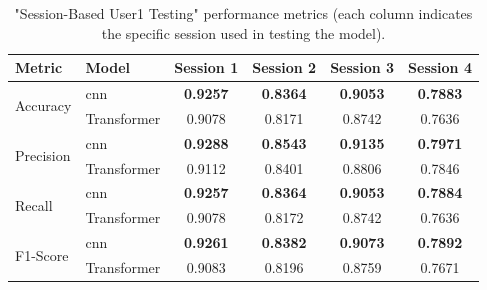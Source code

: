 \begin{table}[ht]
    \captionsetup{width=0.8\textwidth}
    \centering
    \caption{"Session-Based User1 Testing" performance metrics (each column indicates the specific session used in testing the model).}
    \label{table:results_session_based_user1}
    \begin{tabular}{l|lcccc}
        \toprule
        Metric & Model & Session 1 & Session 2 & Session 3 & Session 4 \\
        \midrule
        \multirow{2}{*}{Accuracy} & \acs{cnn} & \textbf{0.9257} & \textbf{0.8364} & \textbf{0.9053} & \textbf{0.7883} \\
        & Transformer & 0.9078 & 0.8171 & 0.8742 & 0.7636 \\
        \midrule
        \multirow{2}{*}{Precision} & \acs{cnn} & \textbf{0.9288} & \textbf{0.8543} & \textbf{0.9135} & \textbf{0.7971} \\
        & Transformer & 0.9112 & 0.8401 & 0.8806 & 0.7846 \\
        \midrule
        \multirow{2}{*}{Recall} & \acs{cnn} & \textbf{0.9257} & \textbf{0.8364} & \textbf{0.9053} & \textbf{0.7884} \\
        & Transformer & 0.9078 & 0.8172 & 0.8742 & 0.7636 \\
        \midrule
        \multirow{2}{*}{F1-Score} & \acs{cnn} & \textbf{0.9261} & \textbf{0.8382} & \textbf{0.9073} & \textbf{0.7892} \\
        & Transformer & 0.9083 & 0.8196 & 0.8759 & 0.7671 \\
        \bottomrule
    \end{tabular}
\end{table}


